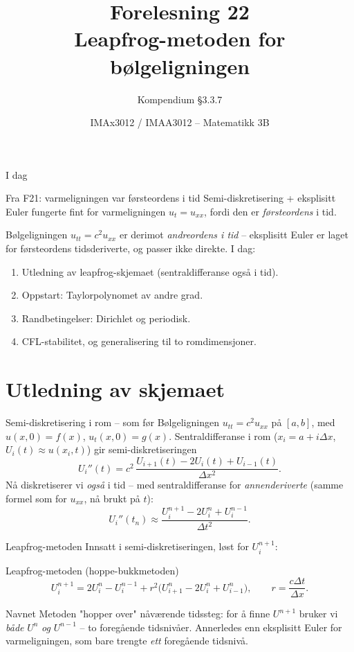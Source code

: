 \documentclass[11pt,aspectratio=169]{beamer}
\title[F22 -- Leapfrog]{Forelesning 22\\ Leapfrog-metoden for bølgeligningen}
\subtitle{Kompendium §3.3.7}
\author{IMAx3012 / IMAA3012 -- Matematikk 3B}
\date{}
\begin{document}
\begin{frame}
\titlepage
\end{frame}

\begin{frame}{I dag}
\begin{remb}{Fra F21: varmeligningen var førsteordens i tid}
Semi-diskretisering + eksplisitt Euler fungerte fint for varmeligningen $u_t=u_{xx}$, fordi den er \emph{førsteordens} i tid.
\end{remb}
Bølgeligningen $u_{tt}=c^2u_{xx}$ er derimot \emph{andreordens i tid} -- eksplisitt Euler er laget for førsteordens tidsderiverte, og passer ikke direkte. I dag:
\begin{enumerate}
\item Utledning av leapfrog-skjemaet (sentraldifferanse også i tid).
\item Oppstart: Taylorpolynomet av andre grad.
\item Randbetingelser: Dirichlet og periodisk.
\item CFL-stabilitet, og generalisering til to romdimensjoner.
\end{enumerate}
\end{frame}

\section{Utledning av skjemaet}

\begin{frame}{Semi-diskretisering i rom -- som før}
Bølgeligningen $u_{tt}=c^2u_{xx}$ på $[a,b]$, med $u(x,0)=f(x)$, $u_t(x,0)=g(x)$. Sentraldifferanse i rom ($x_i=a+i\Delta x$, $U_i(t)\approx u(x_i,t)$) gir semi-diskretiseringen
\[
U_i''(t) = c^2\,\frac{U_{i+1}(t)-2U_i(t)+U_{i-1}(t)}{\Delta x^2}.
\]
Nå diskretiserer vi \emph{også} i tid -- med sentraldifferanse for \emph{annenderiverte} (samme formel som for $u_{xx}$, nå brukt på $t$):
\[
U_i''(t_n) \approx \frac{U_i^{n+1}-2U_i^n+U_i^{n-1}}{\Delta t^2}.
\]
\end{frame}

\begin{frame}{Leapfrog-metoden}
Innsatt i semi-diskretiseringen, løst for $U_i^{n+1}$:
\begin{oppsumb}{Leapfrog-metoden (hoppe-bukkmetoden)}
\[
U_i^{n+1} = 2U_i^n - U_i^{n-1} + r^2\big(U_{i+1}^n-2U_i^n+U_{i-1}^n\big), \qquad r = \frac{c\Delta t}{\Delta x}.
\]
\end{oppsumb}
\begin{remb}{Navnet}
Metoden "hopper over" nåværende tidssteg: for å finne $U^{n+1}$ bruker vi \emph{både} $U^n$ \emph{og} $U^{n-1}$ -- to foregående tidsnivåer. Annerledes enn eksplisitt Euler for varmeligningen, som bare trengte \emph{ett} foregående tidsnivå.
\end{remb}
\end{frame}
\end{document}

